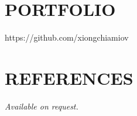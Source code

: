 \documentclass[margin,line]{resume}
\begin{document}
\begin{resume}
\sectionline

    \section{\mysidestyle \textbf{\large{P}\small{ORTFOLIO}}}

    https://github.com/xiongchiamiov

\sectionline

\section{\mysidestyle \textbf{\large{R}\small{EFERENCES}}}

    \textsl{Available on request.}

\end{resume}
\end{document}
